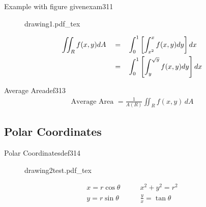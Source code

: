 \begin{example}{Example with figure given}{exam311}
    \begin{figure}[H]
        \def\svgwidth{\columnwidth}
        {drawing1.pdf_tex}
    \end{figure}
    \begin{align}
        \iint_R f(x,y) dA \quad = & \quad \int_0^1\left[\int_{x^2}^{x} f(x,y)dy\right]dx \\
        \quad = & \quad \int_0^1\left[\int_{y}^{\sqrt{y}} f(x,y)dy\right]dx
    \end{align}
\end{example}

\begin{definition}{Average Area}{def313}
    \begin{align*}
        \text{Average Area } = \frac{1}{A(R)}\iint_{R} f(x,y)\,dA
    \end{align*}
\end{definition}

\subsection{Polar Coordinates}
\begin{definitionside}{Polar Coordinates}{def314}
    \begin{figure}[H]
        \def\svgwidth{\columnwidth}
        {drawing2test.pdf_tex}
    \end{figure}
    \tcblower
    \begin{align*}
        x = r\cos\theta \quad & \quad x^2+y^2=r^2 \\
        y = r\sin\theta \quad & \quad \frac{y}x = \tan\theta
    \end{align*}
\end{definitionside}



